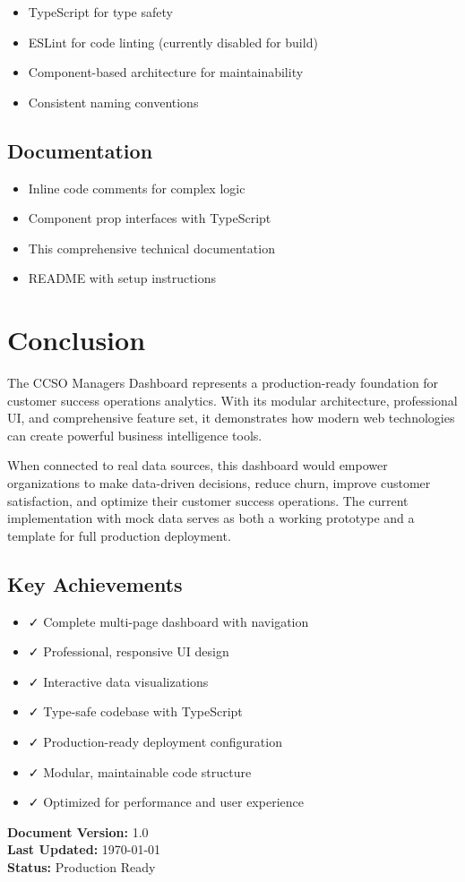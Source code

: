 \documentclass[12pt,a4paper]{article}
\begin{document}
\begin{itemize}
    \item TypeScript for type safety
    \item ESLint for code linting (currently disabled for build)
    \item Component-based architecture for maintainability
    \item Consistent naming conventions
\end{itemize}

\subsection{Documentation}

\begin{itemize}
    \item Inline code comments for complex logic
    \item Component prop interfaces with TypeScript
    \item This comprehensive technical documentation
    \item README with setup instructions
\end{itemize}

\section{Conclusion}

The CCSO Managers Dashboard represents a production-ready foundation for customer success operations analytics. With its modular architecture, professional UI, and comprehensive feature set, it demonstrates how modern web technologies can create powerful business intelligence tools.

When connected to real data sources, this dashboard would empower organizations to make data-driven decisions, reduce churn, improve customer satisfaction, and optimize their customer success operations. The current implementation with mock data serves as both a working prototype and a template for full production deployment.

\subsection{Key Achievements}

\begin{itemize}
    \item ✓ Complete multi-page dashboard with navigation
    \item ✓ Professional, responsive UI design
    \item ✓ Interactive data visualizations
    \item ✓ Type-safe codebase with TypeScript
    \item ✓ Production-ready deployment configuration
    \item ✓ Modular, maintainable code structure
    \item ✓ Optimized for performance and user experience
\end{itemize}

\vspace{1cm}

\noindent\textbf{Document Version:} 1.0 \\
\textbf{Last Updated:} \today \\
\textbf{Status:} Production Ready
\end{document}
